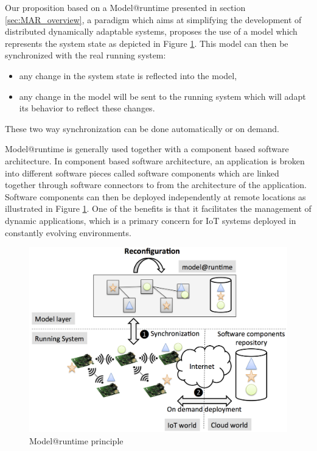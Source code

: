 Our proposition based on a Model@runtime\cite{morin2009mar} presented in section \ref{sec:MAR_overview}, a paradigm which aims at simplifying the development of distributed dynamically adaptable systems, proposes the use of a model which represents the system state as depicted in Figure \ref{fig:MAROverview2}. 
This model can then be synchronized with the real running system: 
\begin{itemize}
	\item any change in the system state is reflected into the model,
	\item any change in the model will be sent to the running system which will adapt its behavior to reflect these changes. 
\end{itemize}
These two way synchronization can be done automatically or on demand.

Model@runtime is generally used together with a component based software architecture.
In component based software architecture, an application is broken into different software pieces called software components which are linked together through software connectors \cite{dashofy2002infrastructure,medvidovic2000classification,van2000koala} to from the architecture of the application.
Software components can then be deployed independently at remote locations as illustrated in Figure \ref{fig:MAROverview2}. 
One of the benefits is that it facilitates the management of dynamic applications, which is a primary concern for IoT systems deployed in constantly evolving environments.

\begin{figure}[htb]
	\centering
	\includegraphics[width=0.95\columnwidth]{chapters/calpulli.images/MAR_Overview.png}
	\caption{Model@runtime principle} \label{fig:MAROverview2}
\end{figure}

